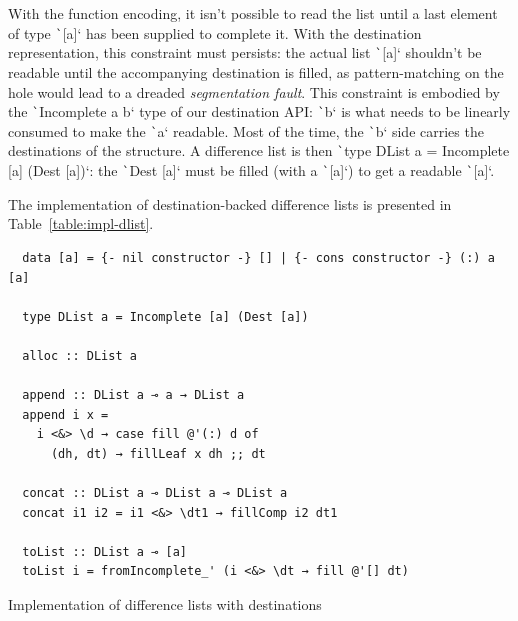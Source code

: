 \documentclass[english]{jflart}
\begin{document}
With the function encoding, it isn't possible to read the list until a last element of type \texttt`[a]` has been supplied to complete it. With the destination representation, this constraint must persists: the actual list \texttt`[a]` shouldn't be readable until the accompanying destination is filled, as pattern-matching on the hole would lead to a dreaded \emph{segmentation fault}. This constraint is embodied by the \texttt`Incomplete a b` type of our destination API: \texttt`b` is what needs to be linearly consumed to make the \texttt`a` readable. Most of the time, the \texttt`b` side carries the destinations of the structure. A difference list is then \texttt`type DList a = Incomplete [a] (Dest [a])`: the \texttt`Dest [a]` must be filled (with a \texttt`[a]`) to get a readable \texttt`[a]`.

The implementation of destination-backed difference lists is presented in Table~\ref{table:impl-dlist}.


\begin{table}[p]
  \small
  \begin{verbatim}
  data [a] = {- nil constructor -} [] | {- cons constructor -} (:) a [a]
  
  type DList a = Incomplete [a] (Dest [a])
  
  alloc :: DList a
  
  append :: DList a ⊸ a → DList a
  append i x =
    i <&> \d → case fill @'(:) d of
      (dh, dt) → fillLeaf x dh ;; dt
  
  concat :: DList a ⊸ DList a ⊸ DList a
  concat i1 i2 = i1 <&> \dt1 → fillComp i2 dt1
  
  toList :: DList a ⊸ [a]
  toList i = fromIncomplete_' (i <&> \dt → fill @'[] dt)
  \end{verbatim}
  \caption{Implementation of difference lists with destinations}
  \label{table:impl-dlist}
  \end{table}
\end{document}
